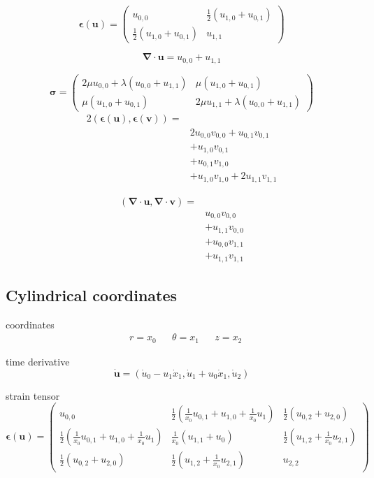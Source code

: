 \documentclass{scrartcl}
\newcommand{\vect}[1]{\boldsymbol{#1}}
\newcommand{\ten}[1]{\boldsymbol{#1}}
\begin{document}
\[
\ten{\epsilon}(\vect{u}) =
\begin{pmatrix}
u_{0,0} & \frac{1}{2}(u_{1,0} + u_{0,1}) \\
\frac{1}{2}(u_{1,0} + u_{0,1}) & u_{1,1}
\end{pmatrix}
\]

\[
\vect{\nabla} \cdot \vect{u} = u_{0,0} + u_{1,1}
\]

\[
\ten{\sigma} =
\begin{pmatrix}
2 \mu u_{0,0} + \lambda (u_{0,0} + u_{1,1}) &
\mu (u_{1,0} + u_{0,1}) \\
\mu (u_{1,0} + u_{0,1}) &
2 \mu u_{1,1} + \lambda (u_{0,0} + u_{1,1})
\end{pmatrix}
\]
\begin{align*}
2(\ten{\epsilon}(\vect{u}), \ten{\epsilon}(\vect{v})) =& \\
&2 u_{0,0} v_{0,0} + u_{0,1} v_{0,1} \\
&+ u_{1,0} v_{0,1} \\
&+ u_{0,1} v_{1,0} \\
&+ u_{1,0} v_{1,0} + 2 u_{1,1} v_{1,1}
\end{align*}

\begin{align*}
(\vect{\nabla} \cdot \vect{u}, \vect{\nabla} \cdot \vect{v}) =& \\
& u_{0,0} v_{0,0} \\
&+ u_{1,1} v_{0,0} \\
&+ u_{0,0} v_{1,1} \\
&+ u_{1,1} v_{1,1}
\end{align*}

\subsection{Cylindrical coordinates}

coordinates
\begin{align*}
&r = x_0 & &\theta = x_1 & &z = x_2
\end{align*}

time derivative
\[
\dot{\vect{u}} = ( \dot{u}_0 - u_1 \dot{x}_1, \dot{u}_1 
+ u_0 \dot{x}_1, \dot{u}_2 )
\]

strain tensor
\[
\ten{\epsilon}(\vect{u}) = 
\begin{pmatrix}
u_{0,0} & \frac{1}{2}(\frac{1}{x_0}u_{0,1} + u_{1,0} + \frac{1}{x_0}u_1) &
\frac{1}{2}(u_{0,2} + u_{2,0}) \\
\frac{1}{2}(\frac{1}{x_0}u_{0,1} + u_{1,0} + \frac{1}{x_0}u_1) &
\frac{1}{x_0}(u_{1,1} + u_0) & \frac{1}{2}(u_{1,2} + \frac{1}{x_0}u_{2,1}) \\
\frac{1}{2}(u_{0,2} + u_{2,0}) & \frac{1}{2}(u_{1,2} + \frac{1}{x_0}u_{2,1}) &
u_{2,2} 
\end{pmatrix}
\]
\end{document}
